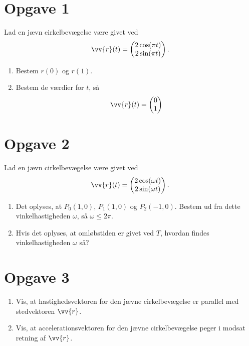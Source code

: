 \section*{Opgave 1}
Lad en jævn cirkelbevægelse være givet ved
	\begin{align*}
		\vv{r}(t) = 
		\begin{pmatrix}
			2\cos(\pi t) \\
			2\sin(\pi t)
		\end{pmatrix}.
	\end{align*}	
\begin{enumerate}[label=\roman*)]
	\item Bestem $r(0)$ og $r(1)$.
	\item Bestem de værdier for $t$, så 
	\begin{align*}
		\vv{r}(t) = 
		\begin{pmatrix}
			0 \\ 1
		\end{pmatrix}
	\end{align*}
\end{enumerate}

\section*{Opgave 2}
Lad en jævn cirkelbevægelse være givet ved
	\begin{align*}
		\vv{r}(t) = 
		\begin{pmatrix}
			2\cos(\omega t) \\
			2\sin(\omega t)
		\end{pmatrix}.
	\end{align*}	
\begin{enumerate}[label=\roman*)]
	\item Det oplyses, at $P_0(1,0)$, $P_1(1,0)$ og $P_2(-1,0)$. Bestem ud fra dette vinkelhastigheden $\omega$, så $\omega \leq 2\pi$.
	\item Hvis det oplyses, at omløbstiden er givet ved $T$, hvordan findes vinkelhastigheden $\omega$ så?
\end{enumerate}

\section*{Opgave 3}

\begin{enumerate}[label=\roman*)]
	\item Vis, at hastighedsvektoren for den jævne cirkelbevægelse er parallel med stedvektoren $\vv{r}$.
	\item Vis, at accelerationsvektoren for den jævne cirkelbevægelse peger i modsat retning af $\vv{r}$.
\end{enumerate}



